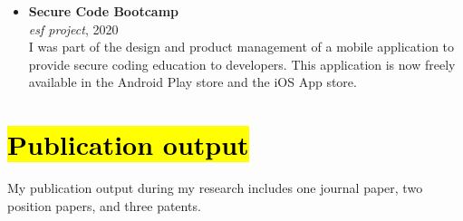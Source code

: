\begin{itemize}
    \item 
    \textbf{Secure Code Bootcamp}\\
    \emph{\gls{esf} project}, 2020\\
    I was part of the design and product management of a mobile application to provide secure coding education to developers.
    This application is now freely available in the Android Play store and the iOS App store.
    
\end{itemize}

\section{\hl{Publication output}}
My publication output during my research includes one journal paper, two position papers, and three patents.

